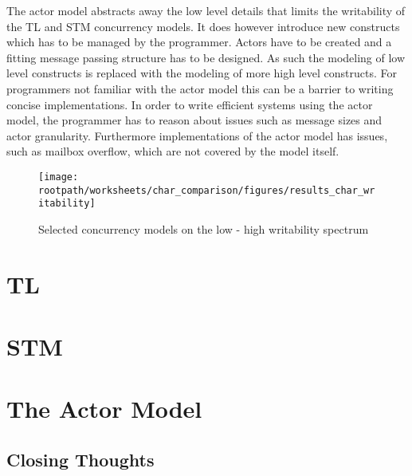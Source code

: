 The actor model abstracts away the low level details that limits the writability of the \ac{TL} and \ac{STM} concurrency models. It does however introduce new constructs which has to be managed by the programmer. Actors have to be created and a fitting message passing structure has to be designed. As such the modeling of low level constructs is replaced with the modeling of more high level constructs. For programmers not familiar with the actor model this can be a barrier to writing concise implementations. In order to write efficient systems using the actor model, the programmer has to reason about issues such as message sizes and actor granularity. Furthermore implementations of the actor model has issues, such as mailbox overflow, which are not covered by the model itself.

\begin{figure}[htbp]
\centering
 \texttt{[image: \\rootpath/worksheets/char\_comparison/figures/results\_char\_writability]} 
 \caption{Selected concurrency models on the low - high writability spectrum}
\label{fig:results_char_writability}
\end{figure}

\section{\acl{TL}}
\section{\acl{STM}}
\section{The Actor Model}

\subsection{Closing Thoughts}
\worksheetend
